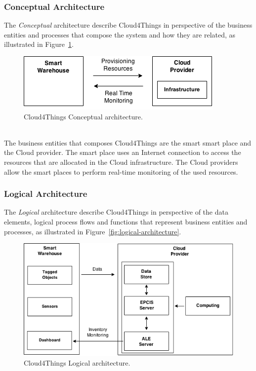 \subsubsection{Conceptual Architecture}
\label{subs:conceptual_architecture}
The \textit{Conceptual} architecture describe Cloud4Things in perspective of
the business entities and processes that compose the system and how they are related,
as illustrated in Figure~\ref{fig:conceptual_architecture}.
\begin{figure}[h!]
  \centering
  \includegraphics[width=.8\textwidth]{./images/conceptual-architecture}
  \caption{Cloud4Things Conceptual architecture.}
  \label{fig:conceptual_architecture}
\end{figure}\\
The business entities that composes Cloud4Things are the smart smart place and the
Cloud provider. The smart place uses an Internet connection to access the resources
that are allocated in the Cloud infrastructure. The Cloud providers allow the smart
places to perform real-time monitoring of the used resources.
\subsubsection{Logical Architecture}
\label{subs:logical_architecture}
The \textit{Logical} architecture describe Cloud4Things in perspective of
the data elements, logical process flows and functions that represent business
entities and processes, as illustrated in Figure~\ref{fig:logical-architecture}.
\begin{figure}[h!]
  \centering
  \includegraphics[width=.8\textwidth]{./images/logical-architecture}
  \caption{Cloud4Things Logical architecture.}
  \label{fig:logical_architecture}
  \end{figure}\\

